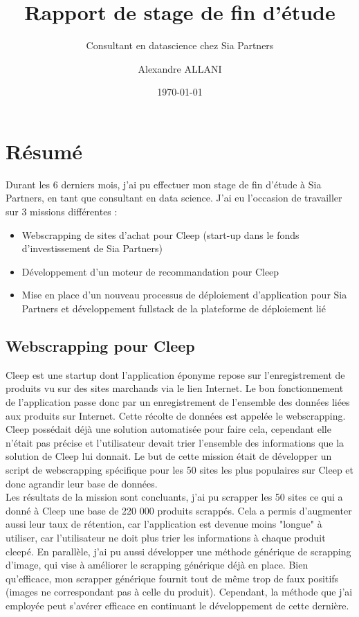 \documentclass{article} %
\author{Alexandre ALLANI}
\date{\noexpand\today} %
\title{Rapport de stage de fin d'étude}
\subtitle{Consultant en datascience chez Sia Partners}
\begin{document}
\section{Résumé}
Durant les 6 derniers mois, j'ai pu effectuer mon stage de fin d'étude à Sia Partners, en tant que consultant en data science. J'ai eu l'occasion de travailler sur 3 missions différentes :
\begin{itemize}
 \item Webscrapping de sites d'achat pour Cleep (start-up dans le fonds d'investissement de Sia Partners)
 \item Développement d'un moteur de recommandation pour Cleep 
 \item Mise en place d'un nouveau processus de déploiement d'application pour Sia Partners et développement fullstack de la plateforme de déploiement lié
\end{itemize}
\subsection{Webscrapping pour Cleep}
Cleep est une startup dont l'application éponyme repose sur l'enregistrement de produits vu sur des sites marchands via le lien Internet. Le bon fonctionnement de l'application passe donc par un enregistrement de l'ensemble des données liées aux produits sur Internet. Cette récolte de données est appelée le webscrapping.\\
Cleep possédait déjà une solution automatisée pour faire cela, cependant elle n'était pas précise et l'utilisateur devait trier l'ensemble des informations que la solution de Cleep lui donnait. Le but de cette mission était de développer un script de webscrapping spécifique pour les 50 sites les plus populaires sur Cleep et donc agrandir leur base de données.\\
Les résultats de la mission sont concluants, j'ai pu scrapper les 50 sites ce qui a donné à Cleep une base de 220 000 produits scrappés. Cela a permis d'augmenter aussi leur taux de rétention, car l'application est devenue moins "longue" à utiliser, car l'utilisateur ne doit plus trier les informations à chaque produit cleepé. En parallèle, j'ai pu aussi développer une méthode générique de scrapping d'image, qui vise à améliorer le scrapping générique déjà en place. Bien qu'efficace, mon scrapper générique fournit tout de même trop de faux positifs (images ne correspondant pas à celle du produit). Cependant, la méthode que j'ai employée peut s'avérer efficace en continuant le développement de cette dernière.
\end{document}
